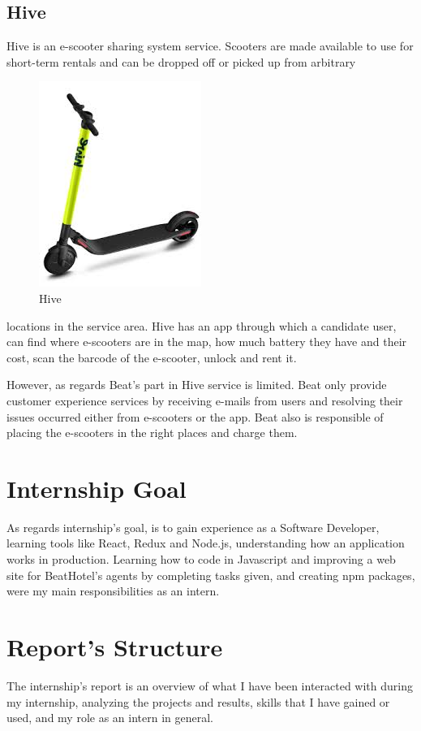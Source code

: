 \subsection{Hive}
Hive is an e-scooter sharing system service. Scooters are made available to use for short-term rentals and can be dropped off or picked up from arbitrary 
\begin{figure}
	\begin{center}
		\includegraphics[scale=0.2]{images/hive.png}
	\end{center}
	\caption{Hive}
\end{figure}
locations in the service area.
Hive has an app through which a candidate user, can find where e-scooters are in the map, how much battery they have and their cost, scan the barcode of the e-scooter, unlock and rent it. \par 
However, as regards Beat's part in Hive service is limited. Beat only provide customer experience services by receiving e-mails from users and resolving their issues occurred either from e-scooters or the app. Beat also is responsible of placing the e-scooters in the right places and charge them.

\newpage
\section{Internship Goal}
 As regards internship's goal, is to gain experience as a Software Developer, learning tools like React, Redux and Node.js, understanding how an application works in production. Learning how to code in Javascript and improving a web site for BeatHotel's agents by completing tasks given, and creating npm packages, were my main responsibilities as an intern.
 
\section{Report's Structure}
The internship's report is an overview of what I have been interacted with during my internship, analyzing the projects and results, skills that I have gained or used, and my role as an intern in general.

